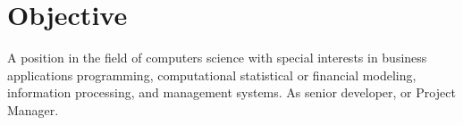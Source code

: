 \section{Objective}

A position in the field of computers science with special interests in business applications
programming, computational statistical or financial modeling, information processing, and
management systems. As senior developer, or Project Manager.

